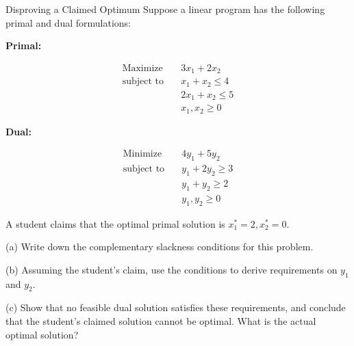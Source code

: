 \begin{ex}{Disproving a Claimed Optimum}{}
\label{ex:cs-claimed-optimal}
 Suppose a linear program has the following primal and dual formulations:

\textbf{Primal:}

$$
\begin{aligned}
\text{Maximize} \quad & 3x_1 + 2x_2 \\
\text{subject to} \quad & x_1 + x_2 \leq 4 \\
& 2x_1 + x_2 \leq 5 \\
& x_1, x_2 \geq 0
\end{aligned}
$$

\textbf{Dual:}

$$
\begin{aligned}
\text{Minimize} \quad & 4y_1 + 5y_2 \\
\text{subject to} \quad & y_1 + 2y_2 \geq 3 \\
& y_1 + y_2 \geq 2 \\
& y_1, y_2 \geq 0
\end{aligned}
$$

A student claims that the optimal primal solution is $x_1^* = 2, x_2^* = 0$.

(a) Write down the complementary slackness conditions for this problem.

(b) Assuming the student's claim, use the conditions to derive requirements on $y_1$ and $y_2$.

(c) Show that no feasible dual solution satisfies these requirements, and conclude that the student's claimed solution cannot be optimal.  What is the actual optimal solution?
\end{ex}



